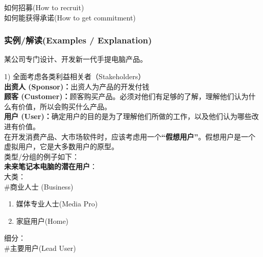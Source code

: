 \begin{description}
\tightlist
\item[]
如何招募(How to recruit)\\

如何能获得承诺(How to get commitment)\\
\end{description}

\begin{description}
\item[]
\end{description}

\hypertarget{ux5b9eux4f8bux89e3ux8bfbexamples-explanation}{%
\subsubsection{\texorpdfstring{\textbf{实例/解读(Examples /
Explanation)}}{实例/解读(Examples / Explanation)}}\label{ux5b9eux4f8bux89e3ux8bfbexamples-explanation}}

某公司专门设计、开发新一代手提电脑产品。

1) 全面考虑各类利益相关者（Stakeholders）\\
\textbf{出资人 (Sponsor)：}出资人为产品的开发付钱\\
\textbf{顾客
(Customer)：}顾客购买产品。必须对他们有足够的了解，理解他们认为什么有价值，所以会购买什么产品。\\
\textbf{用户
(User)：}确定用户的目的是为了理解他们所做的工作，以及他们认为哪些改进有价值。\\
在开发消费产品、大市场软件时，应该考虑用一个\textbf{``假想用户''}。假想用户是一个虚拟用户，它是大多数用户的原型。\\
类型/分组的例子如下：\\
\textbf{未来笔记本电脑的潜在用户}：\\
大类：\\
\#商业人士 (Business)

\begin{enumerate}
\tightlist
\item
  媒体专业人士(Media Pro)
\item
  家庭用户(Home)
\end{enumerate}

细分：\\
\#主要用户(Lead User)

